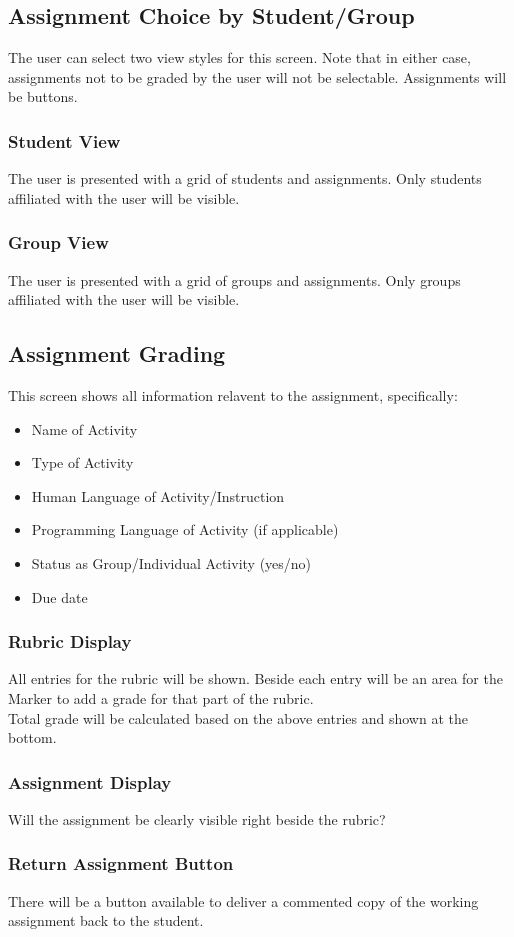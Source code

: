 \documentclass{article}
\begin{document}
\subsection{Assignment Choice by Student/Group}
The user can select two view styles for this screen. Note that in either case,
assignments not to be graded by the user will not be selectable. Assignments
will be buttons.
\subsubsection{Student View}
The user is presented with a grid of students and assignments. Only students
affiliated with the user will be visible.
\subsubsection{Group View}
The user is presented with a grid of groups and assignments. Only groups
affiliated with the user will be visible.
\subsection{Assignment Grading}
This screen shows all information relavent to the assignment, specifically:
\begin{itemize}
  \item Name of Activity
  \item Type of Activity
  \item Human Language of Activity/Instruction
  \item Programming Language of Activity (if applicable)
  \item Status as Group/Individual Activity (yes/no)
  \item Due date
\end{itemize}
\subsubsection{Rubric Display}
All entries for the rubric will be shown. Beside each entry will be an
area for the Marker to add a grade for that part of the rubric.\\
Total grade will be calculated based on the above entries and shown at the
bottom.
\subsubsection{Assignment Display}
Will the assignment be clearly visible right beside the rubric?
\subsubsection{Return Assignment Button}
There will be a button available to deliver a commented copy of the working
assignment back to the student.
\end{document}
